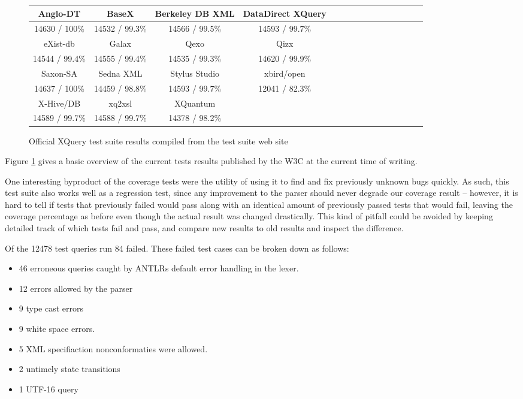 \begin{figure}[h!]
  \begin{center}
    \begin{tabular}{ |c | c | c | c | c | c | c | c | c | c | c | c | c | c | c | }
      \hline
      Anglo-DT        & BaseX           & Berkeley DB XML   & DataDirect XQuery \\ \hline
      14630 / 100\%   & 14532 / 99.3\%  & 14566 / 99.5\%    & 14593 / 99.7\%  \\ \hline \hline
      eXist-db        & Galax           & Qexo              & Qizx \\ \hline            
      14544 / 99.4\%  & 14555 / 99.4\%  & 14535 / 99.3\%    & 14620 / 99.9\% \\ \hline \hline
      Saxon-SA        & Sedna XML       & Stylus Studio     & xbird/open \\ \hline
      14637 / 100\%   & 14459 / 98.8\%  & 14593 / 99.7\%    & 12041 / 82.3\% \\ \hline \hline
      X-Hive/DB       & xq2xsl          & XQuantum          & \\ \hline
      14589 / 99.7\%   & 14588 / 99.7\%  & 14378 / 98.2\%    & \\ 
    \hline
    \end{tabular}
  \end{center}
  \caption[Official XQuery test suite results]{Official XQuery test suite
  results compiled from the test suite web site\cite{w3ctestresults}} 
  \label{figure:table:w3c_test_results}
\end{figure}

Figure \ref{figure:table:w3c_test_results} gives a basic overview of the current
tests results published by the W3C at the current time of writing.

One interesting byproduct of the coverage tests were the utility of using it to
find and fix previously unknown bugs quickly. As such, this test suite also
works well as a regression test, since any improvement to the parser should
never degrade our coverage result -- however, it is hard to tell if tests that
previously failed would pass along with an identical amount of previously
passed tests that would fail, leaving the coverage percentage as before even
though the actual result was changed drastically. This kind of pitfall could be
avoided by keeping detailed track of which tests fail and pass, and compare new
results to old results and inspect the difference.

Of the 12478 test queries run 84 failed. These failed test cases can be broken down as follows:
\begin{itemize}
\item 46 erroneous queries caught by ANTLRs default error handling in the lexer.
\item 12 errors allowed by the parser
\item 9 type cast errors
\item 9 white space errors.
\item 5 XML specifiaction nonconformaties were allowed.
\item 2 untimely state transitions
\item 1 UTF-16 query
\end{itemize}

